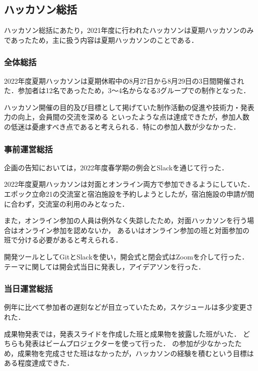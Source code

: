 \subsection*{ハッカソン総括}


ハッカソン総括にあたり，2021年度に行われたハッカソンは夏期ハッカソンのみであったため，主に扱う内容は夏期ハッカソンのことである．

\subsubsection*{全体総括}

2022年度夏期ハッカソンは夏期休暇中の8月27日から8月29日の3日間開催された．参加者は12名であったため，3〜4名からなる3グループでの制作となった．

ハッカソン開催の目的及び目標として掲げていた制作活動の促進や技術力・発表力の向上，会員間の交流を深める
といったような点は達成できたが，参加人数の低迷は憂慮すべき点であると考えられる．特に\thirdGrade{}の参加人数が少なかった．

\subsubsection*{事前運営総括}

企画の告知においては，2022年度春学期の例会とSlackを通じて行った．

2022年度夏期ハッカソンは対面とオンライン両方で参加できるようにしていた．
エポック立命21の交流室と宿泊施設を予約しようとしたが，宿泊施設の申請が間に合わず，交流室の利用のみとなった．

また，オンライン参加の人員は例外なく失踪したため，対面ハッカソンを行う場合はオンライン参加を認めないか，
あるいはオンライン参加の班と対面参加の班で分ける必要があると考えられる．

開発ツールとしてGitとSlackを使い，開会式と閉会式はZoomを介して行った．
テーマに関しては開会式当日に発表し，アイデアソンを行った．

\subsubsection*{当日運営総括}

例年に比べて参加者の遅刻などが目立っていたため，スケジュールは多少変更された．

成果物発表では，発表スライドを作成した班と成果物を披露した班がいた．
どちらも発表はビームプロジェクターを使って行った．
\thirdGrade{}の参加が少なかったため，成果物を完成させた班はなかったが，ハッカソンの経験を積むという目標はある程度達成できた．

